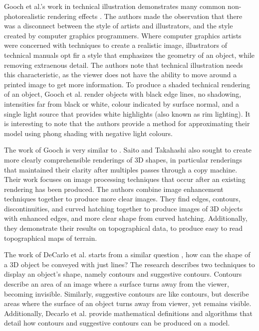 Gooch et al.'s work in technical illustration demonstrates many common non-photorealistic 
rendering effects \cite{gooch98}. The authors made the observation that there was a 
disconnect between the style of artists and illustrators, and the style created by computer 
graphics programmers. Where computer graphics artists were concerned with techniques to 
create a realistic image, illustrators of technical manuals opt fir a style that emphasizes
the geometry of an object, while removing extraenous detail. The authors note that technical
illustration needs this characteristic, as the viewer does not have the ability to move
around a printed image to get more information. To produce a shaded technical rendering of
an object, Gooch et al. render objects with black edge lines, no shadowing, intensities far 
from black or white, colour indicated by surface normal, and a single light source that 
provides white highlights (also known as rim lighting). It is interesting to note that the 
authors provide a method for approximating their model using phong shading with negative 
light colours.

The work of Gooch is very similar to \cite{saito90}. Saito and Takahashi also sought to create
more clearly comprehensible renderings of 3D shapes, in particular renderings that maintained
their clarity after multiples passes through a copy machine. Their work focuses on image 
processing techniques that occur after an existing rendering has been produced. The authors 
combine image enhancement techniques together to produce more clear images. They find edges, 
contours, discontinuities, and curved hatching together to produce images of 3D objects with
enhanced edges, and more clear shape from curved hatching. Additionally, they demonstrate
their results on topographical data, to produce easy to read topographical maps of terrain.

The work of DeCarlo et al. starts from a similar question \cite{decarlo03}, how can the shape 
of a 3D object be conveyed with just lines? The research describes two techniques to display 
an object's shape, namely contours and suggestive contours. Contours describe an area of an 
image where a surface turns away from the viewer, becoming invisible. Similarly, suggestive
contours are like contours, but describe areas where the surface of an object turns away from
viewer, yet remains visible. Additionally, Decarlo et al. provide mathematical definitions
and algorithms that detail how contours and suggestive contours can be produced on a model.

